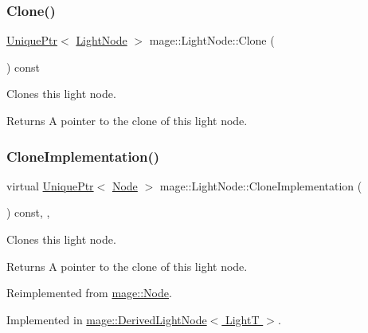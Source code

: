 \subsubsection{\texorpdfstring{Clone()}{Clone()}}
{\footnotesize\ttfamily \hyperlink{namespacemage_a3316d7143a973e37adf1110f2e80ca31}{Unique\+Ptr}$<$ \hyperlink{classmage_1_1_light_node}{Light\+Node} $>$ mage\+::\+Light\+Node\+::\+Clone (\begin{DoxyParamCaption}{ }\end{DoxyParamCaption}) const}

Clones this light node.

\begin{DoxyReturn}{Returns}
A pointer to the clone of this light node. 
\end{DoxyReturn}
\hypertarget{classmage_1_1_light_node_aea97601d0a4b8073a1c655ca334af242}{}\label{classmage_1_1_light_node_aea97601d0a4b8073a1c655ca334af242} 
\subsubsection{\texorpdfstring{Clone\+Implementation()}{CloneImplementation()}}
{\footnotesize\ttfamily virtual \hyperlink{namespacemage_a3316d7143a973e37adf1110f2e80ca31}{Unique\+Ptr}$<$ \hyperlink{classmage_1_1_node}{Node} $>$ mage\+::\+Light\+Node\+::\+Clone\+Implementation (\begin{DoxyParamCaption}{ }\end{DoxyParamCaption}) const\hspace{0.3cm}{\ttfamily [override]}, {\ttfamily [private]}, {}}

Clones this light node.

\begin{DoxyReturn}{Returns}
A pointer to the clone of this light node. 
\end{DoxyReturn}


Reimplemented from \hyperlink{classmage_1_1_node_a71a4763bfd4cba5653488b490e61dc8f}{mage\+::\+Node}.



Implemented in \hyperlink{classmage_1_1_derived_light_node_acf8858989780bf45a45c55a7c5564314}{mage\+::\+Derived\+Light\+Node$<$ Light\+T $>$}.

\hypertarget{classmage_1_1_light_node_a2b971e64ec2267d49c2ba96a00662d3b}{}\label{classmage_1_1_light_node_a2b971e64ec2267d49c2ba96a00662d3b} 
